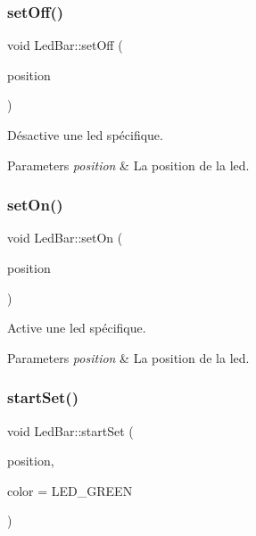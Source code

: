 \subsubsection{\texorpdfstring{set\+Off()}{setOff()}}
{\footnotesize\ttfamily void Led\+Bar\+::set\+Off (\begin{DoxyParamCaption}\item[{int}]{position }\end{DoxyParamCaption})\hspace{0.3cm}{\ttfamily [inline]}}



Désactive une led spécifique. 


\begin{DoxyParams}{Parameters}
{\em position} & La position de la led. \\
\hline
\end{DoxyParams}
\mbox{\label{classLedBar_aebfc6c5221a223364044fc5c6efacd7a}} 
\subsubsection{\texorpdfstring{set\+On()}{setOn()}}
{\footnotesize\ttfamily void Led\+Bar\+::set\+On (\begin{DoxyParamCaption}\item[{int}]{position }\end{DoxyParamCaption})\hspace{0.3cm}{\ttfamily [inline]}}



Active une led spécifique. 


\begin{DoxyParams}{Parameters}
{\em position} & La position de la led. \\
\hline
\end{DoxyParams}
\mbox{\label{classLedBar_a985018b17b5051935a30d19e32880e11}} 
\subsubsection{\texorpdfstring{start\+Set()}{startSet()}}
{\footnotesize\ttfamily void Led\+Bar\+::start\+Set (\begin{DoxyParamCaption}\item[{uint}]{position,  }\item[{Led\+Color}]{color = {\ttfamily LED\+\_\+GREEN} }\end{DoxyParamCaption})}



